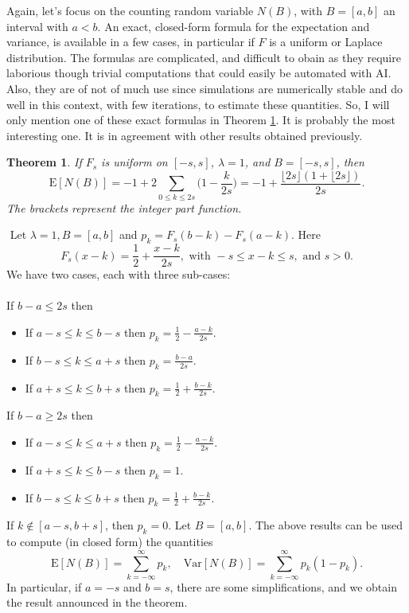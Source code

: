 \documentclass[10pt]{article}
\newtheorem{theorem}{Theorem}[section]
\newenvironment{proof}[1][Proof]{\begin{trivlist}
\item[\hskip \labelsep {\bfseries #1}]}{\end{trivlist}}
\newcommand{\qed}{\nobreak \ifvmode \relax \else
      \ifdim\lastskip<1.5em \hskip-\lastskip
      \hskip1.5em plus0em minus0.5em \fi \nobreak
      \vrule height0.75em width0.5em depth0.25em\fi}
\begin{document}
Again, let's focus on the counting random variable $N(B)$, with $B=[a, b]$ an interval with $a<b$. An exact, closed-form formula for the expectation and variance, is available in a few cases, in particular if $F$ is a uniform or Laplace distribution. The formulas are complicated, and difficult to obain as they require laborious though trivial computations that could easily be automated with AI. Also, they are of not of much use since simulations are \textcolor{index}{numerically stable} and do well in this context, with few iterations, to estimate these quantities. So, I will only mention one of these exact formulas in Theorem \ref{sums6}. It is probably the most interesting one. It is in agreement with other results obtained previously. 

\begin{theorem}
\label{sums6}
If $F_s$ is \textcolor{index}{uniform}  on $[-s, s]$, $\lambda=1$, and $B=[-s,s]$, then
$$\mbox{E}[N(B)]= -1+2\sum_{0\leq k\leq 2s}\Big(1-\frac{k}{2s}\Big)=-1+\frac{\lfloor 2s\rfloor(1+\lfloor 2s\rfloor)}{2s}. $$
The brackets represent the integer part function.
 \end{theorem}
\begin{proof}
$ $ \newline 
Let $\lambda=1, B=[a, b]$ and $p_k=F_s(b-k)-F_s(a-k)$. Here 
$$F_s(x-k)=\frac{1}{2}+\frac{x-k}{2s}, \mbox{ with } -s\leq x-k\leq s, \mbox{ and } s>0.$$
We have two cases, each with three sub-cases: \\ \\
If $b-a\leq 2s$ then 
\begin{itemize}
 \item If $a-s\leq k\leq b-s$ then $p_k=\frac{1}{2}-\frac{a-k}{2s}$.
 \item If $b-s\leq k \leq a+s$ then $p_k=\frac{b-a}{2s}$.
 \item If $a+s\leq k \leq b+s$ then $p_k=\frac{1}{2}+\frac{b-k}{2s}$.
\end{itemize}
If $b-a\geq 2s$ then 
\begin{itemize}
 \item If $a-s\leq k\leq a+s$ then $p_k=\frac{1}{2}-\frac{a-k}{2s}$.
 \item If $a+s\leq k \leq b-s$ then $p_k=1$.
 \item If $b-s\leq k \leq b+s$ then $p_k=\frac{1}{2}+\frac{b-k}{2s}$.
\end{itemize}
If $k\notin [a-s,b+s]$, then $p_k=0$. Let $B=[a,b]$. The above results can be used to compute (in closed form) the quantities
$$\mbox{E}[N(B)]=\sum_{k=-\infty}^\infty p_k, \quad
\mbox{Var}[N(B)]=\sum_{k=-\infty}^\infty p_k(1-p_k).$$
In particular, if $a=-s$ and $b=s$, there are some simplifications, and we obtain the result announced in the theorem.
\qed
\end{proof}
\end{document}
